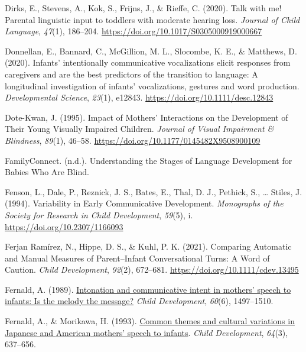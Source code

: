 \documentclass[
  man,floatsintext]{apa6}
\newlength{\cslhangindent}
\newlength{\cslentryspacingunit} %
\newenvironment{CSLReferences}[2] %
 {%
  \setlength{\parindent}{0pt}
  \ifodd #1
  \let\oldpar\par
  \def\par{\hangindent=\cslhangindent\oldpar}
  \fi
  \setlength{\parskip}{#2\cslentryspacingunit}
 }%
 {}
\begin{document}
\begin{CSLReferences}{1}{0}
\leavevmode{}%
Dirks, E., Stevens, A., Kok, S., Frijns, J., \& Rieffe, C. (2020). Talk with me! {Parental} linguistic input to toddlers with moderate hearing loss. \emph{Journal of Child Language}, \emph{47}(1), 186--204. \url{https://doi.org/10.1017/S0305000919000667}

\leavevmode{}%
Donnellan, E., Bannard, C., McGillion, M. L., Slocombe, K. E., \& Matthews, D. (2020). Infants' intentionally communicative vocalizations elicit responses from caregivers and are the best predictors of the transition to language: {A} longitudinal investigation of infants' vocalizations, gestures and word production. \emph{Developmental Science}, \emph{23}(1), e12843. \url{https://doi.org/10.1111/desc.12843}

\leavevmode{}%
Dote-Kwan, J. (1995). Impact of {Mothers}' {Interactions} on the {Development} of {Their Young Visually Impaired Children}. \emph{Journal of Visual Impairment \& Blindness}, \emph{89}(1), 46--58. \url{https://doi.org/10.1177/0145482X9508900109}

\leavevmode{}%
FamilyConnect. (n.d.). Understanding the {Stages} of {Language Development} for {Babies Who Are Blind}.

\leavevmode{}%
Fenson, L., Dale, P., Reznick, J. S., Bates, E., Thal, D. J., Pethick, S., \ldots{} Stiles, J. (1994). Variability in {Early Communicative Development}. \emph{Monographs of the Society for Research in Child Development}, \emph{59}(5), i. \url{https://doi.org/10.2307/1166093}

\leavevmode{}%
Ferjan Ramírez, N., Hippe, D. S., \& Kuhl, P. K. (2021). Comparing {Automatic} and {Manual Measures} of {Parent}--{Infant Conversational Turns}: {A Word} of {Caution}. \emph{Child Development}, \emph{92}(2), 672--681. \url{https://doi.org/10.1111/cdev.13495}

\leavevmode{}%
Fernald, A. (1989). \href{https://www.ncbi.nlm.nih.gov/pubmed/2612255}{Intonation and communicative intent in mothers' speech to infants: Is the melody the message?} \emph{Child Development}, \emph{60}(6), 1497--1510.

\leavevmode{}%
Fernald, A., \& Morikawa, H. (1993). \href{https://www.ncbi.nlm.nih.gov/pubmed/8339686}{Common themes and cultural variations in {Japanese} and {American} mothers' speech to infants}. \emph{Child Development}, \emph{64}(3), 637--656.


\end{CSLReferences}
\end{document}
